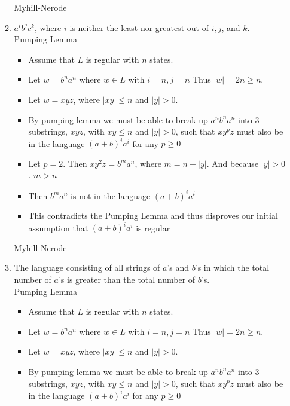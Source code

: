 \begin{enumerate}
\begin{enumerate}
\begin{itemize}
\end{itemize}
Myhill-Nerode\\
	
	\item $a^ib^jc^k$, where $i$ is neither the least nor greatest out of $i,j$, and $k$.
	\\Pumping Lemma
\begin{itemize}
	\item 	Assume that $L$ is regular with $n$ states.  	
	\item Let $w = b^na^n$ where $w \in L$ with $i=n, j=n$ Thus $|w| = 2n  \geq n$.
	
	\item Let $w = xyz$, where $|xy| \leq n$ and $|y| > 0$.
	
	\item By pumping lemma we must be able to break up $a^nb^na^n$ into 3 substrings, $xyz$, with $xy \leq n$ and $|y| > 0$, such that $xy^pz$ must also be in the language $(a + b)^ia^i$ for any $p \geq 0$
	
	\item Let $p = 2$. Then $xy^2z = b^ma^n$, where $m = n + |y|$.  And because $|y| > 0$. $m>n$
	
	\item Then $b^ma^n$ is not in the language $(a + b)^ia^i$
	
	\item This contradicts the Pumping Lemma and thus disproves our initial assumption that $(a + b)^ia^i$ is regular
	
\end{itemize}
Myhill-Nerode\\
	
	\item The language consisting of all strings of $a$'s and $b$'s in which the total number of $a$'s is greater than the total number of $b$'s.
	\\Pumping Lemma
\begin{itemize}
	\item 	Assume that $L$ is regular with $n$ states.  	
	\item Let $w = b^na^n$ where $w \in L$ with $i=n, j=n$ Thus $|w| = 2n  \geq n$.
	
	\item Let $w = xyz$, where $|xy| \leq n$ and $|y| > 0$.
	
	\item By pumping lemma we must be able to break up $a^nb^na^n$ into 3 substrings, $xyz$, with $xy \leq n$ and $|y| > 0$, such that $xy^pz$ must also be in the language $(a + b)^ia^i$ for any $p \geq 0$
	

\end{itemize}
\end{enumerate}
\end{enumerate}
